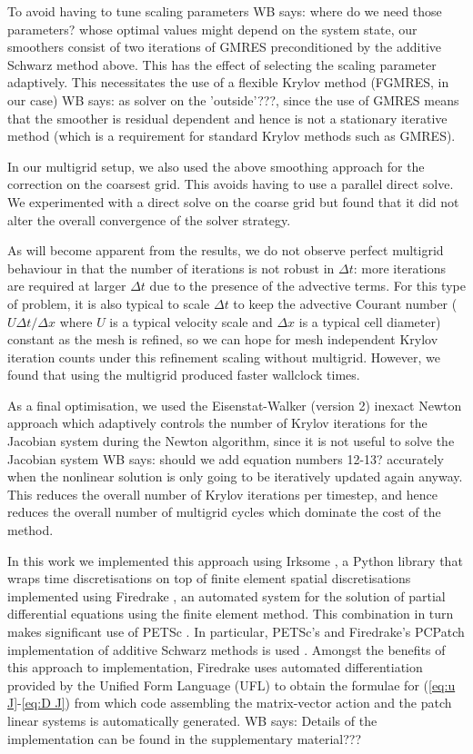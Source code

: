 \documentclass[a4paper, 12pt]{article}
\newcommand{\werner}[1]{{\color{magenta}WB says: #1}}
\begin{document}
To avoid having to tune scaling parameters \werner{where do we need those parameters?} whose optimal values might
depend on the system state, our smoothers consist of two iterations of
GMRES preconditioned by the additive Schwarz method above. This has
the effect of selecting the scaling parameter adaptively.  This
necessitates the use of a flexible Krylov method (FGMRES, in our
case) \werner{as solver on the 'outside'???}, since the use of GMRES means that the smoother is residual
dependent and hence is not a stationary iterative method (which is a
requirement for standard Krylov methods such as GMRES).

In our multigrid setup, we also used the above smoothing approach for
the correction on the coarsest grid. This avoids having to use a
parallel direct solve. We experimented with a direct solve on the coarse
grid but found that it did not alter the overall convergence of the
solver strategy.

As will become apparent from the results, we do not observe perfect
multigrid behaviour in that the number of iterations is not robust in
$\Delta t$: more iterations are required at larger $\Delta t$ due to
the presence of the advective terms.  For this type of problem, it is
also typical to scale $\Delta t$ to keep the advective Courant number
($U\Delta t/\Delta x$ where $U$ is a typical velocity scale and
$\Delta x$ is a typical cell diameter) constant as the mesh is
refined, so we can hope for mesh independent Krylov iteration counts
under this refinement scaling without multigrid. However, we found
that using the multigrid produced faster wallclock times.

As a final optimisation, we used the Eisenstat-Walker (version 2)
inexact Newton approach \citep{eisenstat1996choosing} which adaptively
controls the number of Krylov iterations for the Jacobian system
during the Newton algorithm, since it is not useful to solve the
Jacobian system \werner{should we add equation numbers 12-13?} accurately when the nonlinear solution is only going
to be iteratively updated again anyway. This reduces the overall
number of Krylov iterations per timestep, and hence reduces the overall
number of multigrid cycles which dominate the cost of the method.

In this work we implemented this approach using Irksome
\citep{farrell2021irksome,kirby2024extending}, a Python library that
wraps time discretisations on top of finite element spatial
discretisations implemented using Firedrake
\citep{FiredrakeUserManual}, an automated system for the solution of
partial differential equations using the finite element method.  This
combination in turn makes significant use of PETSc
\citep{dalcin2011parallel,balay2019petsc}. In particular, PETSc's and
Firedrake's PCPatch implementation of additive Schwarz methods is used
\citep{farrell2021pcpatch}.  Amongst the benefits of this approach to
implementation, Firedrake uses automated differentiation provided by
the Unified Form Language (UFL) \citep{alnaes2012ufl} to obtain the
formulae for (\ref{eq:u J}-\ref{eq:D J}) from which code assembling
the matrix-vector action and the patch linear systems is automatically
generated.
\werner{Details of the implementation can be found in the supplementary material???}
\end{document}
